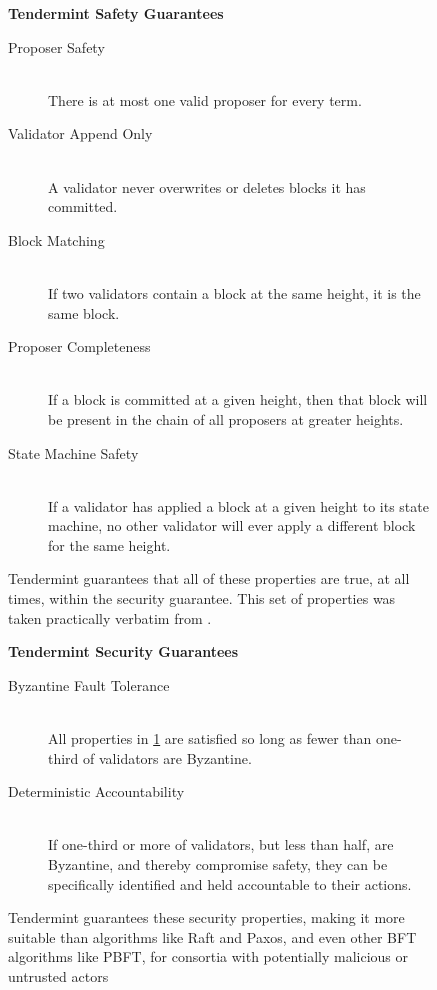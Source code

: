 \begin{figure}[]
	\textbf{Tendermint Safety Guarantees}
	\begin{description}
	  \item[Proposer Safety] \hfill \\
		There is at most one valid proposer for every term.
	  \item[Validator Append Only] \hfill \\
		A validator never overwrites or deletes blocks it has committed.
	  \item[Block Matching] \hfill \\
		If two validators contain a block at the same height, it is the same block.
	  \item[Proposer Completeness] \hfill \\
		If a block is committed at a given height, then that block will be present in the chain of all proposers at greater heights.
	  \item[State Machine Safety] \hfill \\
		If a validator has applied a block at a given height to its state machine, no other validator will ever apply a different block for the same height.
	\end{description}
  	\caption[Tendermint Safety Guarantees]{Tendermint guarantees that all of these properties are true, at all times, within the security guarantee. This set of properties was taken practically verbatim from \cite{raft_thesis}.}
	\label{fig:tendermint_guarantees}
\end{figure}

\begin{figure}[]
	\textbf{Tendermint Security Guarantees}
	\begin{description}
	  \item[Byzantine Fault Tolerance] \hfill \\
		All properties in \ref{fig:tendermint_guarantees} are satisfied so long as fewer than one-third of validators are Byzantine.
	  \item[Deterministic Accountability] \hfill \\
		If one-third or more of validators, but less than half, are Byzantine, and thereby compromise safety, 
		they can be specifically identified and held accountable to their actions.
	\end{description}
  	\caption[Tendermint Security Guarantees]{Tendermint guarantees these security properties, making it more suitable than algorithms like Raft and Paxos, and even other BFT algorithms like PBFT, for consortia with potentially malicious or untrusted actors}
	\label{fig:tendermint_security}
\end{figure}


